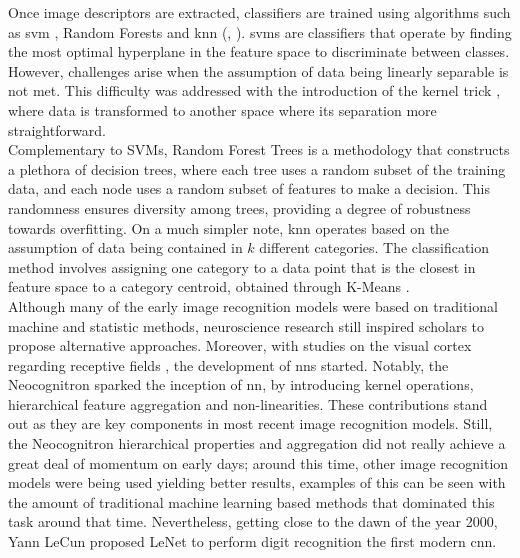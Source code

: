 \noindent Once image descriptors are extracted, classifiers are trained using algorithms such as 
\gls{svm} \autocite{cortes1995support}, Random Forests \autocite{ho1995random} and \gls{knn}
(\cite{cover1967nearest}, \cite{fix1989discriminatory}). \glspl{svm} are classifiers that operate 
by finding the most optimal hyperplane in the feature space to discriminate between classes. 
However, challenges arise when the assumption of data being linearly separable is not met. This 
difficulty was addressed with the introduction of the kernel trick \autocite{hofmann2008kernel}, 
where data is transformed to another space where its separation more straightforward.\\
Complementary to SVMs, Random Forest Trees is a methodology that constructs a plethora of decision 
trees, where each tree uses a random subset of the training data, and each node uses a random 
subset of features to make a decision. This randomness ensures diversity among trees, providing a 
degree of robustness towards overfitting. On a much simpler note, \gls{knn} operates based on the 
assumption of data being contained in $k$ different categories. The classification method involves 
assigning one category to a data point that is the closest in feature space to a category centroid, 
obtained through K-Means \autocite{macqueen1967some}.\\

\noindent Although many of the early image recognition models were based on traditional machine 
and statistic methods, neuroscience research still inspired scholars to propose alternative 
approaches. Moreover, with studies on the visual cortex regarding receptive fields 
\autocite{hubel1959receptive}, the development of \glspl{nn} started. Notably, the 
Neocognitron \autocite{fukushima1975cognitron} sparked the inception of  \gls{nn}, by introducing 
kernel operations, hierarchical feature aggregation and non-linearities. These contributions stand 
out as they are key components in most recent image recognition models.
Still, the Neocognitron hierarchical properties and aggregation did not really achieve 
a great deal of momentum on early days; around this time, other image recognition models were being 
used yielding better results, examples of this can be seen with the amount of traditional machine 
learning based methods that dominated this task around that time. Nevertheless, getting close to the 
dawn of the year 2000, Yann LeCun proposed LeNet to perform digit recognition 
\autocite{lecun1998gradient} the first modern \gls{cnn}.\\

